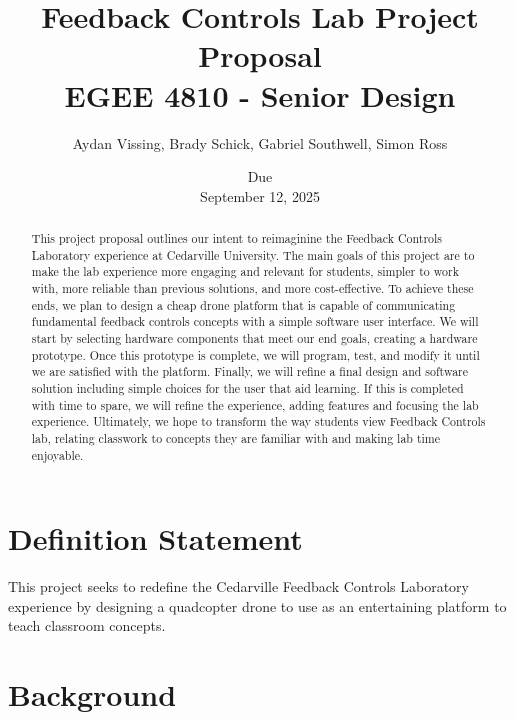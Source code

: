 \documentclass[12pt, titlepage]{article}
\title{Feedback Controls Lab Project Proposal \\ \normalsize{EGEE 4810 - Senior Design}}
\author{Aydan Vissing, Brady Schick, Gabriel Southwell, Simon Ross}
\date{\footnotesize{Due} \\ \normalsize{September 12, 2025}}
\begin{document}
\maketitle


\begin{abstract}
This project proposal outlines our intent to reimaginine the Feedback Controls Laboratory experience at Cedarville University. The main goals of this project are to make the lab experience more engaging and relevant for students, simpler to work with, more reliable than previous solutions, and more cost-effective. To achieve these ends, we plan to design a cheap drone platform that is capable of communicating fundamental feedback controls concepts with a simple software user interface. We will start by selecting hardware components that meet our end goals, creating a hardware prototype. Once this prototype is complete, we will program, test, and modify it until we are satisfied with the platform. Finally, we will refine a final design and software solution including simple choices for the user that aid learning. If this is completed with time to spare, we will refine the experience, adding features and focusing the lab experience. Ultimately, we hope to transform the way students view Feedback Controls lab, relating classwork to concepts they are familiar with and making lab time enjoyable.
\end{abstract}

\newpage
\tableofcontents

\newpage
\section{Definition Statement}

This project seeks to redefine the Cedarville Feedback Controls Laboratory experience by designing a quadcopter drone to use as an entertaining platform to teach classroom concepts.

\section{Background}
\end{document}
